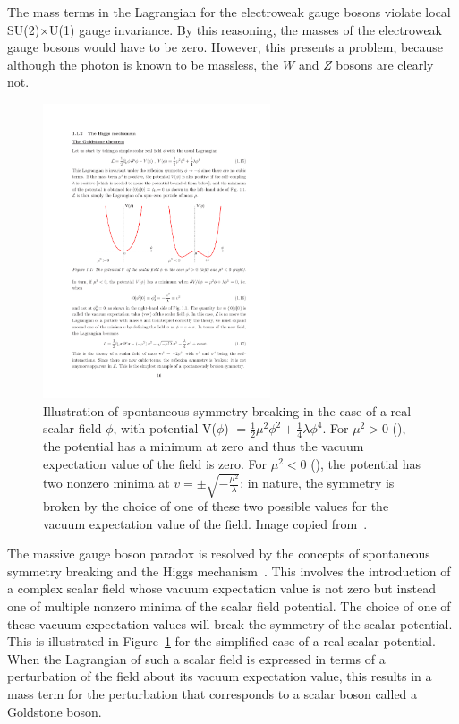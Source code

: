 The mass terms in the Lagrangian for the electroweak gauge bosons violate local SU(2)$\times$U(1) gauge invariance. By this reasoning, the masses of the electroweak gauge bosons would have to be zero. However, this presents a problem, because although the photon is known to be massless, the $W$ and $Z$ bosons are clearly not.

\begin{figure}
   \begin{center}
      \includegraphics[width=0.6\textwidth]{figures/intro-Higgspotential}
      \caption{Illustration of spontaneous symmetry breaking in the case of a real scalar field $\phi$, with potential V($\phi$) $= \frac{1}{2}\mu^2\phi^2 + \frac{1}{4}\lambda\phi^4$. For $\mu^2 > 0$ (\cmsLeft), the potential has a minimum at zero and thus the vacuum expectation value of the field is zero. For $\mu^2 < 0$ (\cmsRight), the potential has two nonzero minima at $v = \pm\sqrt{-\frac{\mu^2}{\lambda}}$; in nature, the symmetry is broken by the choice of one of these two possible values for the vacuum expectation value of the field. Image copied from~\cite{Djouadi:2005gi}.}
      \label{fig:higgspotential}
   \end{center}
\end{figure}

The massive gauge boson paradox is resolved by the concepts of spontaneous symmetry breaking and the Higgs mechanism~\cite{ThomsonPhysics}. This involves the introduction of a complex scalar field whose vacuum expectation value is not zero but instead one of multiple nonzero minima of the scalar field potential. The choice of one of these vacuum expectation values will break the symmetry of the scalar potential. This is illustrated in Figure~\ref{fig:higgspotential} for the simplified case of a real scalar potential. When the Lagrangian of such a scalar field is expressed in terms of a perturbation of the field about its vacuum expectation value, this results in a mass term for the perturbation that corresponds to a scalar boson called a Goldstone boson.


